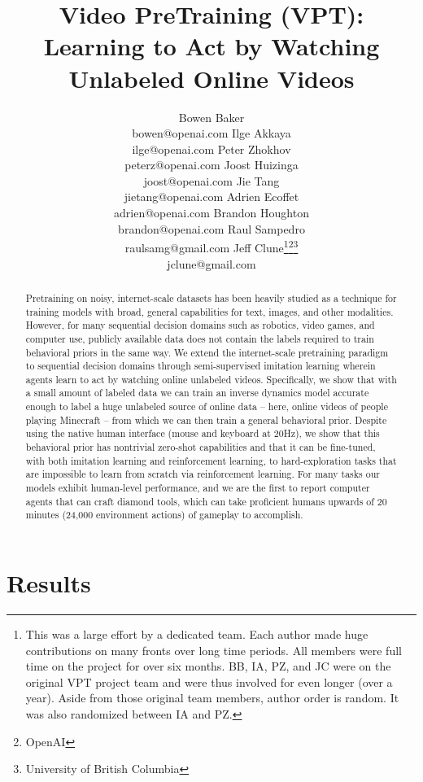 \documentclass{article}
\title{Video PreTraining (VPT): Learning to Act by Watching Unlabeled Online Videos}
\author{
Bowen Baker\footnotemark[1]\hspace{4px}\footnotemark[2]\\bowen@openai.com\And
Ilge Akkaya\footnotemark[1]\hspace{4px}\footnotemark[2]\\ilge@openai.com\And
Peter Zhokhov\footnotemark[1]\hspace{4px}\footnotemark[2]\\peterz@openai.com\And
Joost Huizinga\footnotemark[1]\hspace{4px}\footnotemark[2]\\joost@openai.com\And
Jie Tang\footnotemark[1]\hspace{4px}\footnotemark[2]\\jietang@openai.com\And
Adrien Ecoffet\footnotemark[1]\hspace{4px}\footnotemark[2]\\adrien@openai.com\And
Brandon Houghton\footnotemark[1]\hspace{4px}\footnotemark[2]\\brandon@openai.com\And
Raul Sampedro\footnotemark[1]\hspace{4px}\footnotemark[2]\\raulsamg@gmail.com\And
Jeff Clune\thanks{This was a large effort by a dedicated team. Each author made huge contributions on many fronts over long time periods. All members were full time on the project for over six months. BB, IA, PZ, and JC were on the original VPT project team and were thus involved for even longer (over a year). Aside from those original team members, author order is random. It was also randomized between IA and PZ.}\hspace{4px}\thanks{OpenAI}\hspace{4px}\thanks{University of British Columbia}\\jclune@gmail.com
}
\newif\ifcomment
\begin{document}
\commenttrue %

\maketitle

\renewcommand{\thefootnote}{(\roman{footnote})}

\begin{abstract}
Pretraining on noisy, internet-scale datasets has been heavily studied as a technique for training models with broad, general capabilities for text, images, and other modalities.\cite{brown2020language,devlin2018bert,liu2019roberta,raffel2019exploring,mahajan2018exploring,radford2021learning}
However, for many sequential decision domains such as robotics, video games, and computer use, publicly available data does not contain the labels required to train behavioral priors in the same way. We extend the internet-scale pretraining paradigm to sequential decision domains through semi-supervised imitation learning wherein agents learn to act by watching online unlabeled videos.
Specifically, we show that with a small amount of labeled data we can train an inverse dynamics model accurate enough to label a huge unlabeled source of online data -- here, online videos of people playing Minecraft -- from which we can then train a general behavioral prior.
Despite using the native human interface (mouse and keyboard at 20Hz), we show that this behavioral prior has nontrivial zero-shot capabilities and that it can be fine-tuned, with both imitation learning and reinforcement learning, to hard-exploration tasks that are impossible to learn from scratch via reinforcement learning. For many tasks our models exhibit human-level performance, and we are the first to report computer agents that can craft diamond tools, which can take proficient humans upwards of 20 minutes (24,000 environment actions) of gameplay to accomplish. 
\end{abstract}




\section{Results}
\label{section:results}






\end{document}
